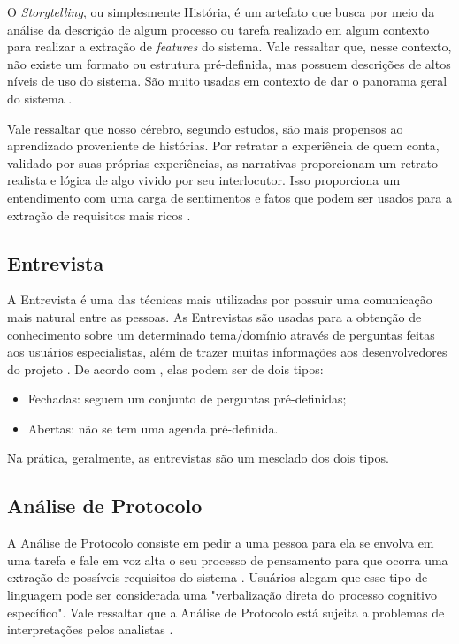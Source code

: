 O \textit{Storytelling}, ou simplesmente História, é um artefato que busca por meio da análise da descrição de algum processo ou tarefa realizado em algum contexto para realizar a extração de \textit{features} do sistema. Vale ressaltar que, nesse contexto, não existe um formato ou estrutura pré-definida, mas possuem descrições de altos níveis de uso do sistema. São muito usadas em contexto de dar o panorama geral do sistema  \cite{Sommerville10}.

Vale ressaltar que nosso cérebro, segundo estudos, são mais propensos ao aprendizado proveniente de histórias. Por retratar a experiência de quem conta, validado por suas próprias experiências, as narrativas proporcionam um retrato realista e lógica de algo vivido por seu interlocutor. Isso proporciona um entendimento com uma carga de sentimentos e fatos que podem ser usados para a extração de requisitos mais ricos  \cite{storytelling}.

\subsection{Entrevista}
A Entrevista é uma das técnicas mais utilizadas por possuir uma comunicação mais natural entre as pessoas. As Entrevistas são usadas para a obtenção de conhecimento sobre um determinado tema/domínio através de perguntas feitas aos usuários especialistas, além de trazer muitas informações aos desenvolvedores do projeto \cite{batista2003taxonomia}. De acordo com \cite{Sommerville10}, elas podem ser de dois tipos:
\begin{itemize}
    \item Fechadas: seguem um conjunto de perguntas pré-definidas;
    \item Abertas: não se tem uma agenda pré-definida.
\end{itemize}
Na prática, geralmente, as entrevistas são um mesclado dos dois tipos.

\subsection{Análise de Protocolo}
A Análise de Protocolo consiste em pedir a uma pessoa para ela se envolva em uma tarefa e fale em voz alta o seu processo de pensamento para que ocorra uma extração de possíveis requisitos do sistema \cite{goguen1993techniques}. Usuários alegam que esse tipo de linguagem pode ser considerada uma "verbalização direta do processo cognitivo específico". Vale ressaltar que a Análise de Protocolo está sujeita a problemas de interpretações pelos analistas \cite{belgamo2000estudo}.

